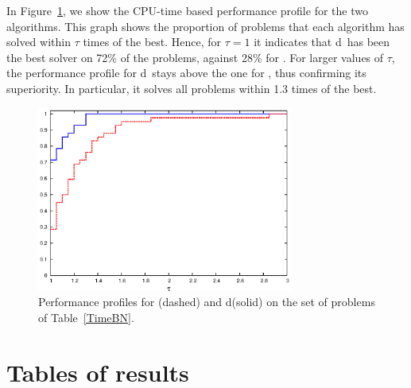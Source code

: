 In Figure~\ref{fig:PerfProfile}, we show the CPU-time based 
performance profile \cite{DolanMore} for the two algorithms. 
This graph shows the proportion of problems that each algorithm
has solved within $\tau$ times of the best. Hence, for
$\tau = 1$ it indicates that d\HO\ has been the best solver on 72\%
of the problems, against 28\% for \HO. For larger values of $\tau$,
the performance profile for d\HO\ stays above the one for \HO, thus
confirming its superiority. In particular, it solves all problems
within 1.3 times of the best.
%
\begin{figure}[ht]
  \centering
  \includegraphics[width=0.75\textwidth]{figures/perfprof-BN.eps}
  \caption{Performance profiles for \HO (dashed) and d\HO (solid)
           on the set of problems of Table~\ref{TimeBN}.}
  \label{fig:PerfProfile}
\end{figure}

\section{Tables of results}
\setlength{\tabcolsep}{4.2pt}

%
%


